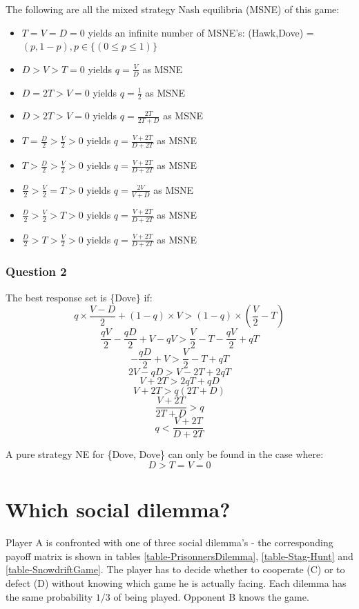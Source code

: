 \documentclass[a4paper, 11pt]{article}
\begin{document}
The following are all the mixed strategy Nash equilibria (MSNE) of this game:
\begin{itemize}[noitemsep]
  \setlength\itemsep{0.5em}
  \item $T=V=D=0$ yields an infinite number of MSNE's: (Hawk,Dove) = $(p,1-p), p \in \{(0\leq p \leq 1) \}$
  \item $D>V>T=0$ yields $q=\frac{V}{D}$ as MSNE
  \item $D=2T>V=0$ yields $q=\frac{1}{2}$ as MSNE
  \item $D>2T>V=0$ yields $q=\frac{2T}{2T+D}$ as MSNE
  \item $T=\frac{D}{2}>\frac{V}{2}>0$ yields $q=\frac{V+2T}{D+2T}$ as MSNE
  \item $T>\frac{D}{2}>\frac{V}{2}>0$ yields $q=\frac{V+2T}{D+2T}$ as MSNE
  \item $\frac{D}{2}>\frac{V}{2}=T>0$ yields $q=\frac{2V}{V+D}$ as MSNE
  \item $\frac{D}{2}>\frac{V}{2}>T>0$ yields $q=\frac{V+2T}{D+2T}$ as MSNE
  \item $\frac{D}{2}>T>\frac{V}{2}>0$ yields $q=\frac{V+2T}{D+2T}$ as MSNE
\end{itemize}

\subsubsection{Question 2}

The best response set is \{Dove\} if:
\[ q \times \frac{V-D}{2} + (1-q) \times V > (1-q) \times ( \frac{V}{2} - T) \]
\[ \frac{qV}{2} - \frac{qD}{2} + V - qV > \frac{V}{2} - T - \frac{qV}{2} + qT \]
\[ - \frac{qD}{2} + V  > \frac{V}{2} - T + qT \]
\[ 2V - qD > V - 2T + 2qT \]
\[ V + 2T > 2qT + qD \]
\[ V + 2T > q(2T + D) \]
\[ \frac{V + 2T}{2T + D} > q \]
\[ q < \frac{V+2T}{D+2T} \]

A pure strategy NE for \{Dove, Dove\} can only be found in the case where:
\[ D>T=V=0 \]

\newpage
\section{Which social dilemma?}

Player A is confronted with one of three social dilemma's - the corresponding payoff matrix is shown in tables \ref{table-PrisonnersDilemma}, \ref{table-Stag-Hunt} and \ref{table-SnowdriftGame}. The player has to decide whether to cooperate (C) or to defect (D) without knowing which game he is actually facing. Each dilemma has the same probability $1/3$ of being played. Opponent B knows the game.
\end{document}
